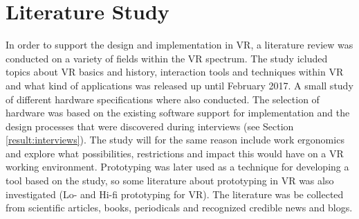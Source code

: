 \section{Literature Study}
In order to support the design and implementation in VR, a literature review was conducted on a variety of fields within the VR spectrum. The study icluded topics about VR basics and history, interaction tools and techniques within VR and what kind of applications was released up until February 2017. A small study of different hardware specifications where also conducted. The selection of hardware was based on the existing software support for implementation and the design processes that were discovered during interviews (see Section \ref{result:interviews}). The study will for the same reason include work ergonomics and explore what possibilities, restrictions and impact this would have on a VR working environment. Prototyping was later used as a technique for developing a tool based on the study, so some literature about prototyping in VR was also investigated (Lo- and Hi-fi prototyping for VR). The literature was be collected from scientific articles, books, periodicals and recognized credible news and blogs.
